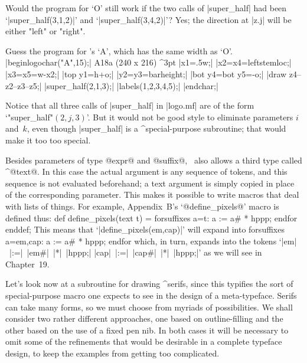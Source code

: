 {{{{\exercise Would the program for `{\manual O}' still work if the two calls of
|super_half| had been `|super_half(3,1,2)|' and `|super_half(3,4,2)|'\thinspace?
\answer Yes; the direction at |z.j| will be either "left" or "right".

\exercise Guess the program for \MF's `{\manual A}', which has the
same width as `{\manual O}'.
\answer |beginlogochar("A",15);|
\rightfig A18a ({240\apspix} x {216\apspix}) ^3pt \parbreak
|x1=.5w;|\parbreak
|x2=x4=leftstemloc;|\parbreak
|x3=x5=w-x2;|\parbreak
|top y1=h+o;|\parbreak
|y2=y3=barheight;|\parbreak
|bot y4=bot y5=-o;|\parbreak
|draw z4--z2--z3--z5;|\parbreak
|super_half(2,1,3);|\parbreak
|labels(1,2,3,4,5);|\parbreak
|endchar;|\par\smallskip\noindent
Notice that all three calls of |super_half| in |logo.mf| are of the form
`"super\_half"$(2,j,3)$'. But it would not be good style to eliminate
parameters $i$ and~$k$, even though |super_half| is a ^{special-purpose}
subroutine; that would make it too too special.

\danger Besides parameters of type @expr@ and @suffix@, \MF\ also
allows a third type called ^@text@. In this case the actual argument
is any sequence of tokens, and this sequence is not evaluated
beforehand; a text argument is simply copied in place of the
corresponding parameter. This makes it possible to write macros that
deal with lists of things. For example, Appendix~B's `@define\_pixels@'
macro is defined thus:
\begintt
def define_pixels(text t) =
 forsuffixes a=t: a := a# * hppp; endfor enddef;
\endtt
This means that `|define_pixels(em,cap)|' will expand into
\begintt
forsuffixes a=em,cap: a := a# * hppp; endfor
\endtt
which, in turn, expands into the tokens `|em|~|:=|~|em#|~|*|~|hppp;|
|cap|~|:=|~|cap#|~|*|~|hppp;|' as we will see in Chapter~19.

\danger Let's look now at a subroutine for drawing ^{serifs}, since
this typifies the sort of special-purpose macro one expects to see
in the design of a meta-typeface. Serifs can take many forms,
so we must choose from myriads of possibilities. We shall consider
two rather different approaches, one based on outline-filling and the
other based on the use of a fixed pen nib. In both cases it will be
necessary to omit some of the refinements that would be desirable
in a complete typeface design, to keep the examples from
getting too complicated.

}}}}
